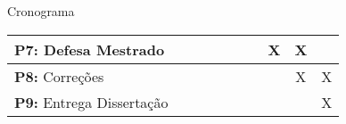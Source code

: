\begin{frame}{Cronograma}
\begin{table}[]
{\begin{tabular}{@{}cccccccccc@{}}
        \multicolumn{1}{|l|}{\textbf{P7:} Defesa Mestrado} & \multicolumn{1}{c|}{}  & \multicolumn{1}{c|}{}  & \multicolumn{1}{c|}{}  & \multicolumn{1}{c|}{}  & \multicolumn{1}{c|}{}  & \multicolumn{1}{c|}{}  & \multicolumn{1}{c|}{X} & \multicolumn{1}{c|}{X} & \multicolumn{1}{c|}{}  \\ \midrule
        \multicolumn{1}{|l|}{\textbf{P8:} Correções} & \multicolumn{1}{c|}{}  & \multicolumn{1}{c|}{}  & \multicolumn{1}{c|}{}  & \multicolumn{1}{c|}{}  & \multicolumn{1}{c|}{}  & \multicolumn{1}{c|}{}  & \multicolumn{1}{c|}{}  & \multicolumn{1}{c|}{X} & \multicolumn{1}{c|}{X} \\ \midrule
        \multicolumn{1}{|l|}{\textbf{P9:} Entrega Dissertação} & \multicolumn{1}{c|}{}  & \multicolumn{1}{c|}{}  & \multicolumn{1}{c|}{}  & \multicolumn{1}{c|}{}  & \multicolumn{1}{c|}{}  & \multicolumn{1}{c|}{}  & \multicolumn{1}{c|}{}  & \multicolumn{1}{c|}{}  & \multicolumn{1}{c|}{X} \\ \bottomrule
        \end{tabular}
        }
    \end{table}
\end{frame}

